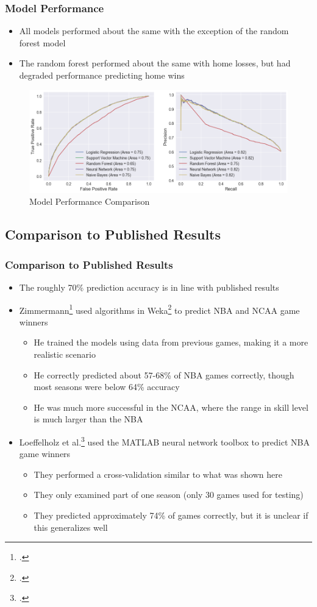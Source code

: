 \documentclass{beamer}
\begin{document}
\begin{frame}
\frametitle{Model Performance}
\begin{itemize}
    \item All models performed about the same with the exception of the random forest model
    \item The random forest performed about the same with home losses, but had degraded performance predicting home wins
\end{itemize}
\begin{figure}
\includegraphics[scale=0.35]{../docs/assets/images/model-performance/model-performance-comparison.png}
\caption{Model Performance Comparison}
\end{figure}
\end{frame}

\subsection{Comparison to Published Results}
\begin{frame}
\frametitle{Comparison to Published Results}
\begin{itemize}
    \item The roughly 70\% prediction accuracy is in line with published results
    \item Zimmermann\footcite{zimmermann} used algorithms in Weka\footcite{witten} to predict NBA and NCAA game winners
    \begin{itemize}
        \item He trained the models using data from previous games, making it a more realistic scenario
        \item He correctly predicted about 57-68\% of NBA games correctly, though most seasons were below 64\% accuracy
        \item He was much more successful in the NCAA, where the range in skill level is much larger than the NBA
    \end{itemize}
    \item Loeffelholz et al.\footcite{loeffelholz} used the MATLAB neural network toolbox to predict NBA game winners
    \begin{itemize}
        \item They performed a cross-validation similar to what was shown here
        \item They only examined part of one season (only 30 games used for testing)
        \item They predicted approximately 74\% of games correctly, but it is unclear if this generalizes well
    \end{itemize}
\end{itemize}
\end{frame}
\end{document}

